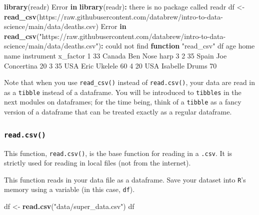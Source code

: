\documentclass[
]{book}
\newenvironment{Shaded}{\begin{snugshade}}{\end{snugshade}}
\newcommand{\ControlFlowTok}[1]{\textcolor[rgb]{0.13,0.29,0.53}{\textbf{#1}}}
\newcommand{\DecValTok}[1]{\textcolor[rgb]{0.00,0.00,0.81}{#1}}
\newcommand{\FunctionTok}[1]{\textcolor[rgb]{0.13,0.29,0.53}{\textbf{#1}}}
\newcommand{\NormalTok}[1]{#1}
\newcommand{\OtherTok}[1]{\textcolor[rgb]{0.56,0.35,0.01}{#1}}
\newcommand{\SpecialCharTok}[1]{\textcolor[rgb]{0.81,0.36,0.00}{\textbf{#1}}}
\newcommand{\StringTok}[1]{\textcolor[rgb]{0.31,0.60,0.02}{#1}}
\begin{document}
\begin{Shaded}
\begin{Highlighting}[]
\FunctionTok{library}\NormalTok{(readr)}
\NormalTok{Error }\ControlFlowTok{in} \FunctionTok{library}\NormalTok{(readr)}\SpecialCharTok{:}\NormalTok{ there is no package called }\StringTok{\textquotesingle{}readr\textquotesingle{}}
\NormalTok{df }\OtherTok{\textless{}{-}} \FunctionTok{read\_csv}\NormalTok{(}\StringTok{\textquotesingle{}https://raw.githubusercontent.com/databrew/intro{-}to{-}data{-}science/main/data/deaths.csv\textquotesingle{}}\NormalTok{)}
\NormalTok{Error }\ControlFlowTok{in} \FunctionTok{read\_csv}\NormalTok{(}\StringTok{"https://raw.githubusercontent.com/databrew/intro{-}to{-}data{-}science/main/data/deaths.csv"}\NormalTok{)}\SpecialCharTok{:}\NormalTok{ could not find }\ControlFlowTok{function} \StringTok{"read\_csv"}
\NormalTok{df}
\NormalTok{  age   home     name instrument x\_factor}
\DecValTok{1}  \DecValTok{33}\NormalTok{ Canada      Ben  Nose harp        }\DecValTok{3}
\DecValTok{2}  \DecValTok{35}\NormalTok{  Spain      Joe Concertina       }\DecValTok{20}
\DecValTok{3}  \DecValTok{35}\NormalTok{    USA     Eric    Ukelele       }\DecValTok{60}
\DecValTok{4}  \DecValTok{20}\NormalTok{    USA Isabelle      Drums       }\DecValTok{70}
\end{Highlighting}
\end{Shaded}

Note that when you use \texttt{read\_csv()} instead of \texttt{read.csv()}, your data are read in as a \texttt{tibble} instead of a dataframe. You will be introduced to \texttt{tibbles} in the next modules on dataframes; for the time being, think of a \texttt{tibble} as a fancy version of a dataframe that can be treated exactly as a regular dataframe.

\subsubsection*{\texorpdfstring{\texttt{read.csv()}}{read.csv()}}\label{read.csv}

This function, \texttt{read.csv()}, is the base function for reading in a \texttt{.csv}. It is strictly used for reading in local files (not from the internet).

This function reads in your data file as a dataframe. Save your dataset into \texttt{R}'s memory using a variable (in this case, \texttt{df}).

\begin{Shaded}
\begin{Highlighting}[]
\NormalTok{df }\OtherTok{\textless{}{-}} \FunctionTok{read.csv}\NormalTok{(}\StringTok{"data/super\_data.csv"}\NormalTok{)}
\NormalTok{df}
\end{Highlighting}
\end{Shaded}
\end{document}

